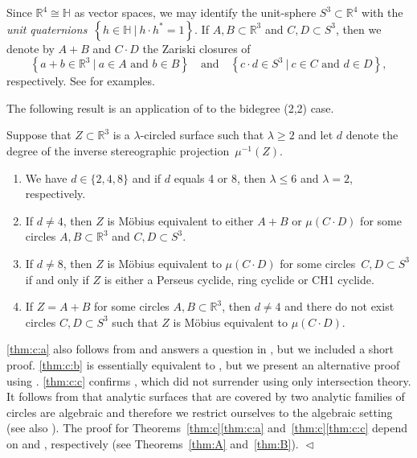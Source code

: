 \documentclass[11pt]{article}
\newenvironment{claims}{\begin{enumerate}[topsep=0pt,itemsep=0pt,leftmargin=8mm,label=\textnormal{\textbf{(\alph*)}},ref=(\alph*)]}{\end{enumerate}}
\newcommand{\R}{\mathbb{R}}
\renewcommand{\H}{\mathbb{H}}
\newcommand{\set}[2]{\left\{#1 ~|~ #2\right\}}
\newcommand{\df}{\emph}
\newcommand{\resp}{respectively}
\newcommand{\st}{such that }
\newcommand{\END}{\hfill $\vartriangleleft$}
\begin{document}
Since $\R^4\cong\H$ as vector spaces, we may identify the unit-sphere $S^3\subset\R^4$ with
the \df{unit quaternions}~$\set{h\in\H}{h\cdot h^*=1}$.
If $A,B\subset \R^3$ and $C,D\subset S^3$, then
we denote by $A+B$ and $C\cdot D$
the Zariski closures of
\[
\set{a+b \in \R^3}{ a\in A \text{ and } b\in B}
\quad\text{and}\quad
\set{c\cdot d \in S^3}{ c\in C \text{ and } d\in D},
\]
\resp.
See  for examples.

The following result is an application of  to the bidegree (2,2) case.

\begin{theorem}
\label{thm:c}
Suppose that $Z\subset \R^3$ is a $\lambda$-circled surface such that $\lambda\geq 2$
and let $d$ denote the degree of the inverse stereographic projection~$\mu^{-1}(Z)$.
\begin{claims}
\item\label{thm:c:a}
We have $d\in \{2,4,8\}$ and
if $d$ equals 4 or 8, then $\lambda\leq 6$ and $\lambda=2$, \resp.
\item\label{thm:c:b}
If $d\neq 4$, then $Z$ is M\"obius equivalent to either $A+B$ or $\mu(C\cdot D)$
for some circles $A,B\subset \R^3$ and $C,D\subset S^3$.
\item\label{thm:c:c}
If $d\neq 8$,
then $Z$ is M\"obius equivalent to $\mu(C\cdot D)$
for some circles~$C,D\subset S^3$
if and only if
$Z$ is either a Perseus cyclide, ring cyclide or CH1 cyclide.
\item\label{thm:c:d}
If $Z=A+B$ for some circles $A,B\subset\R^3$,
then $d\neq 4$ and there do not exist circles $C,D\subset S^3$ \st
$Z$ is M\"obius equivalent to $\mu(C\cdot D)$.
\end{claims}
\end{theorem}

\begin{remark}
\label{rmk:known}
\ref{thm:c:a} also follows from \citep[Theorem~1]{2021circ}
and answers a question in \citep[]{2012web}, but we included a short proof.
\ref{thm:c:b} is essentially equivalent to \citep[Main~Theorem~1.1]{2018sko},
but we present an alternative proof using .
\ref{thm:c:c} confirms \citep[Conjecture~1]{2023trans},
which did not surrender using only intersection theory.
It follows from \citep[Theorem~1]{2001} that analytic surfaces that are covered
by two analytic families of circles are algebraic
and therefore we restrict ourselves to the algebraic setting
(see also \citep[]{2018sko}).
The proof for Theorems~\ref{thm:c}\ref{thm:c:a} and~\ref{thm:c}\ref{thm:c:c} depend
on \cite{2001} and \cite{2023trans}, respectively (see Theorems~\ref{thm:A} and~\ref{thm:B}).
\END
\end{remark}
\end{document}
